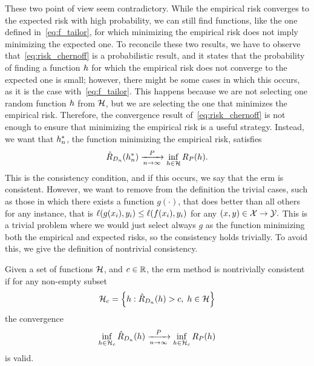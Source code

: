 %
These two point of view seem contradictory. While the empirical risk converges to the expected risk with high probability, we can still find functions, like the one defined in~\eqref{eq:f_tailor}, for which minimizing the empirical risk does not imply minimizing the expected one.
%
To reconcile these two results, we have to observe that~\eqref{eq:risk_chernoff} is a probabilistic result, and it states that the probability of finding a function $h$ for which the empirical risk does not converge to the expected one is small; however, there might be some cases in which this occurs, as it is the case with~\eqref{eq:f_tailor}. This happens because we are not selecting one random function $h$ from $\mathcal{H}$, but we are selecting the one that minimizes the empirical risk.
%
Therefore, the convergence result of~\eqref{eq:risk_chernoff} is not enough to ensure that minimizing the empirical risk is a useful strategy.
%
Instead, we want that ${h}^*_n$, the function  minimizing the empirical risk, satisfies
\begin{equation}
    \nonumber
    \hat{R}_{D_{n}}({h}^*_n) \xrightarrow[n \to \infty]{P} \inf_{h \in \mathcal{H}} R_P(h) .
\end{equation}
This is the consistency condition, and if this occurs, we say that the \acrshort{erm} is consistent.
However, we want to remove from the definition the trivial cases, such as those in which there exists a function $g(\cdot)$, that does better than all others for any instance, that is 
$\ell(g(x_i), y_i) \leq \ell(f(x_i), y_i)$ for any $(x, y) \in \mathcal{X} \to \mathcal{Y}.$
This is a trivial problem where we would just select always $g$ as the function minimizing both the empirical and expected risks, so the consistency holds trivially.
To avoid this, we give the definition of nontrivial consistency.
\begin{definition}
    Given a set of functions $\mathcal{H}$, and $c \in \mathbb{R}$, the \acrshort{erm} method is nontrivially consistent if for any non-empty subset 
    \begin{equation}
        \nonumber
        \mathcal{H}_c = \left\{h: \hat{R}_{D_{n}}(h) > c, \; h \in \mathcal{H}\right\}
    \end{equation}
    the convergence
    \begin{equation}
        \nonumber
        \inf_{h \in \mathcal{H}_c} \hat{R}_{D_{n}}(h) \xrightarrow[n \to \infty]{P} \inf_{h \in \mathcal{H}_c} R_P(h) 
    \end{equation}
    is valid.
\end{definition}
